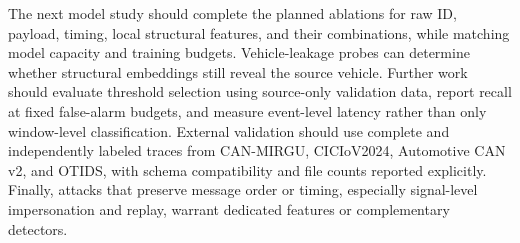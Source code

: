 \documentclass[12pt, a4paper, reqno, oneside]{book}
\begin{document}
The next model study should complete the planned ablations for raw ID, payload, timing, local structural features, and their combinations, while matching model capacity and training budgets. Vehicle-leakage probes can determine whether structural embeddings still reveal the source vehicle. Further work should evaluate threshold selection using source-only validation data, report recall at fixed false-alarm budgets, and measure event-level latency rather than only window-level classification. External validation should use complete and independently labeled traces from CAN-MIRGU, CICIoV2024, Automotive CAN v2, and OTIDS, with schema compatibility and file counts reported explicitly. Finally, attacks that preserve message order or timing, especially signal-level impersonation and replay, warrant dedicated features or complementary detectors.


\newpage
{} 
% 


\end{document}

